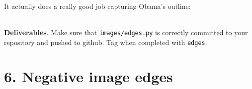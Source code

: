 It actually does a really good job capturing Obama's outline:\\
~\\

\begin{minipage}{\linewidth}
\end{minipage}

\begin{callout}{\bcplume}
{\bf Deliverables}. Make sure that {\tt images/edges.py} is correctly committed to your repository and pushed to github. Tag when completed with {\tt edges}.
\end{callout}

\section{6. Negative image edges}

